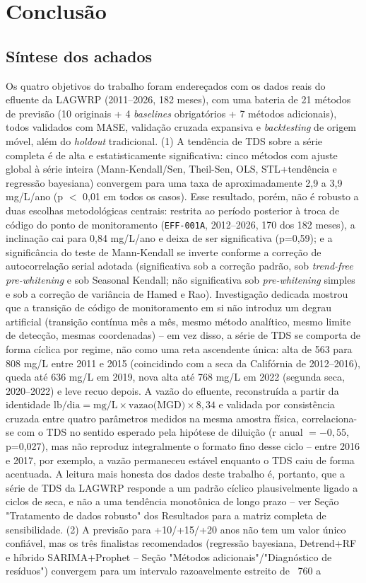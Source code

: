 \section{Conclusão}

\subsection{Síntese dos achados}

Os quatro objetivos do trabalho foram endereçados com os dados reais do efluente da LAGWRP (2011--2026, 182 meses), com uma bateria de 21 métodos de previsão (10 originais + 4 \textit{baselines} obrigatórios + 7 métodos adicionais), todos validados com MASE, validação cruzada expansiva e \textit{backtesting} de origem móvel, além do \textit{holdout} tradicional. (1) A tendência de TDS sobre a série completa é de alta e estatisticamente significativa: cinco métodos com ajuste global à série inteira (Mann-Kendall/Sen, Theil-Sen, OLS, STL+tendência e regressão bayesiana) convergem para uma taxa de aproximadamente 2,9 a 3,9 mg/L/ano (p $<$ 0,01 em todos os casos). Esse resultado, porém, não é robusto a duas escolhas metodológicas centrais: restrita ao período posterior à troca de código do ponto de monitoramento (\texttt{EFF-001A}, 2012--2026, 170 dos 182 meses), a inclinação cai para 0,84 mg/L/ano e deixa de ser significativa (p=0,59); e a significância do teste de Mann-Kendall se inverte conforme a correção de autocorrelação serial adotada (significativa sob a correção padrão, sob \textit{trend-free pre-whitening} e sob Seasonal Kendall; não significativa sob \textit{pre-whitening} simples e sob a correção de variância de Hamed e Rao). Investigação dedicada mostrou que a transição de código de monitoramento em si não introduz um degrau artificial (transição contínua mês a mês, mesmo método analítico, mesmo limite de detecção, mesmas coordenadas) -- em vez disso, a série de TDS se comporta de forma cíclica por regime, não como uma reta ascendente única: alta de 563 para 808 mg/L entre 2011 e 2015 (coincidindo com a seca da Califórnia de 2012--2016), queda até 636 mg/L em 2019, nova alta até 768 mg/L em 2022 (segunda seca, 2020--2022) e leve recuo depois. A vazão do efluente, reconstruída a partir da identidade $\text{lb/dia} = \text{mg/L} \times \text{vazao(MGD)} \times 8,34$ e validada por consistência cruzada entre quatro parâmetros medidos na mesma amostra física, correlaciona-se com o TDS no sentido esperado pela hipótese de diluição (r anual $=-0{,}55$, p=0,027), mas não reproduz integralmente o formato fino desse ciclo -- entre 2016 e 2017, por exemplo, a vazão permaneceu estável enquanto o TDS caiu de forma acentuada. A leitura mais honesta dos dados deste trabalho é, portanto, que a série de TDS da LAGWRP responde a um padrão cíclico plausivelmente ligado a ciclos de seca, e não a uma tendência monotônica de longo prazo -- ver Seção "Tratamento de dados robusto" dos Resultados para a matriz completa de sensibilidade. (2) A previsão para +10/+15/+20 anos não tem um valor único confiável, mas os três finalistas recomendados (regressão bayesiana, Detrend+RF e híbrido SARIMA+Prophet -- Seção "Métodos adicionais"/"Diagnóstico de resíduos") convergem para um intervalo razoavelmente estreito de ~760 a 